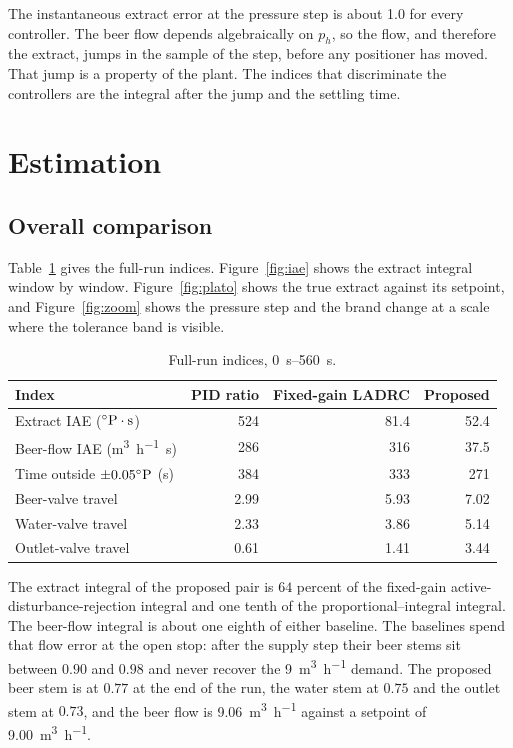The instantaneous extract error at the pressure step is about \SI{1.0}{\plato} for every controller. The beer flow depends algebraically on $p_h$, so the flow, and therefore the extract, jumps in the sample of the step, before any positioner has moved. That jump is a property of the plant. The indices that discriminate the controllers are the integral after the jump and the settling time.

\section{Estimation}
\label{sec:estimation}

\subsection{Overall comparison}

Table~\ref{tab:overall} gives the full-run indices. Figure~\ref{fig:iae} shows the extract integral window by window. Figure~\ref{fig:plato} shows the true extract against its setpoint, and Figure~\ref{fig:zoom} shows the pressure step and the brand change at a scale where the tolerance band is visible.

\begin{table}[htbp]
\centering
\caption{Full-run indices, \SIrange{0}{560}{s}.}
\label{tab:overall}
\begin{tabular}{@{}lrrr@{}}
\toprule
Index & PID ratio & Fixed-gain LADRC & Proposed \\
\midrule
Extract IAE ($^{\circ}\mathrm{P}\cdot\mathrm{s}$) & 524 & 81.4 & 52.4 \\
Beer-flow IAE (\si{\cubic\metre\per\hour\second}) & 286 & 316 & 37.5 \\
Time outside $\pm 0.05^{\circ}\mathrm{P}$ (s) & 384 & 333 & 271 \\
Beer-valve travel & 2.99 & 5.93 & 7.02 \\
Water-valve travel & 2.33 & 3.86 & 5.14 \\
Outlet-valve travel & 0.61 & 1.41 & 3.44 \\
\bottomrule
\end{tabular}
\end{table}

The extract integral of the proposed pair is $64$ percent of the fixed-gain active-disturbance-rejection integral and one tenth of the proportional--integral integral. The beer-flow integral is about one eighth of either baseline. The baselines spend that flow error at the open stop: after the supply step their beer stems sit between $0.90$ and $0.98$ and never recover the \SI{9}{\cubic\metre\per\hour} demand. The proposed beer stem is at $0.77$ at the end of the run, the water stem at $0.75$ and the outlet stem at $0.73$, and the beer flow is \SI{9.06}{\cubic\metre\per\hour} against a setpoint of \SI{9.00}{\cubic\metre\per\hour}.

